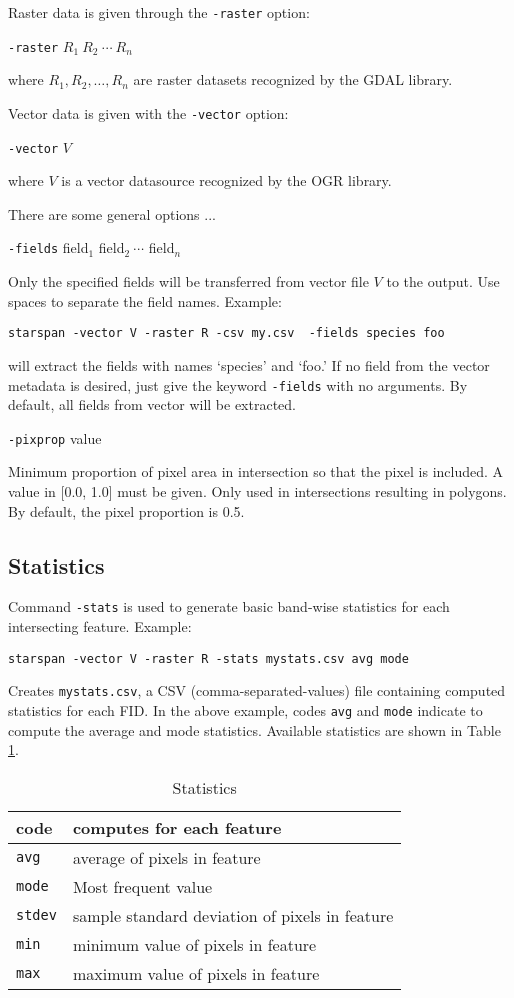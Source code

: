 \documentclass{elsart}
\begin{document}
Raster data is given through the \verb|-raster| option:

	\verb|-raster| $R_1\ R_2\ \cdots\ R_n$

where $R_1, R_2, \ldots, R_n$ are raster datasets recognized by the GDAL library.

Vector data is given with the \verb|-vector| option:
	
	\verb|-vector| $V$

where $V$ is a vector datasource recognized by the OGR library.

There are some general options ...

	\verb|-fields| field$_1$ field$_2\ \cdots$ field$_n$
	
Only the specified fields will be transferred from vector file $V$
to the output. Use spaces to separate the field names.  Example:

   \verb|starspan -vector V -raster R -csv my.csv  -fields species foo|

will extract the fields with names `species' and `foo.' If no field from the
vector metadata is desired, just give the keyword \verb|-fields| with no
arguments. By default, all fields from vector will be extracted.

	\verb|-pixprop| value

Minimum proportion of pixel area in intersection so that the pixel is included.
A value in [0.0, 1.0] must be given.
Only used in intersections resulting in polygons. 
By default, the pixel proportion is 0.5. 



\subsection{Statistics}

Command \verb|-stats| is used to generate basic band-wise statistics for each
intersecting feature. Example:

	\verb|starspan -vector V -raster R -stats mystats.csv avg mode|

Creates \verb|mystats.csv|, a CSV (comma-separated-values) file containing
computed statistics for each FID. In the above example, codes \verb|avg| and
\verb|mode|
indicate to compute the average and mode statistics. Available statistics 
are shown in Table \ref{table-stats}.
\begin{table}[!ht]
\centering
\caption{Statistics}
\begin{tabular}{|l|l|}
\hline 
  code        & computes for each feature\\
\hline
\verb|avg  |  &   average of pixels in feature\\
\verb|mode |  &   Most frequent value\\
\verb|stdev|  &   sample standard deviation of pixels in feature\\
\verb|min  |  &   minimum value of pixels in feature\\
\verb|max  |  &   maximum value of pixels in feature\\
\hline
\end{tabular}
\label{table-stats}
\end{table}
\end{document}
